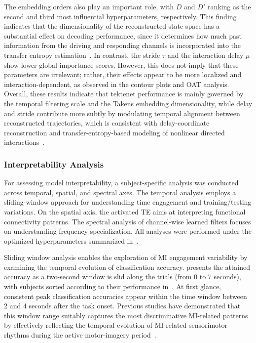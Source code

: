 {The embedding orders also play an important role, with $D$ and $D'$ ranking as the second and third most influential hyperparameters, respectively. This finding indicates that the dimensionality of the reconstructed state space has a substantial effect on decoding performance, since it determines how much past information from the driving and responding channels is incorporated into the transfer entropy estimation~\cite{schreiber2000measuring}. In contrast, the stride $\tau$ and the interaction delay $\mu$ show lower global importance scores. However, this does not imply that these parameters are irrelevant; rather, their effects appear to be more localized and interaction-dependent, as observed in the contour plots and OAT analysis. Overall, these results indicate that \gls{tektenet} performance is mainly governed by the temporal filtering scale and the Takens embedding dimensionality, while delay and stride contribute more subtly by modulating temporal alignment between reconstructed trajectories, which is consistent with delay-coordinate reconstruction and transfer-entropy-based modeling of nonlinear directed interactions~\cite{Vicente2011,faes2011information}.}

\subsubsection{Interpretability Analysis}

For assessing model interpretability, a subject-specific analysis was conducted across temporal, spatial, and spectral axes. The temporal analysis employs a sliding-window approach for understanding time engagement and training/testing variations. On the spatial axis, the activated TE aims at interpreting functional connectivity patterns. The spectral analysis of channel-wise learned filters focuses on understanding frequency specialization. All analyses were performed under the optimized hyperparameters summarized in~.

Sliding window analysis enables the exploration of MI engagement variability by examining the temporal evolution of classification accuracy.  presents the attained accuracy as a two-second window is slid along the trials (from 0 to 7 seconds), with subjects sorted according to their performance in~. At first glance, consistent peak classification accuracies appear within the time window between 2 and 4 seconds after the task onset. Previous studies have demonstrated that this window range suitably captures the most discriminative MI-related patterns by effectively reflecting the {temporal evolution of MI-related sensorimotor rhythms during the active motor-imagery period}~\cite{Gaur2021SlidingWindowCSP}.


